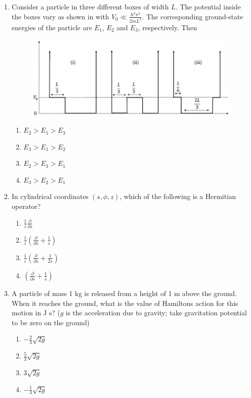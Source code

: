 \documentclass[journal,12pt,onecolumn]{IEEEtran}
\theoremstyle{remark}
\begin{document}
\begin{enumerate}
\item
Consider a particle in three different boxes of width $L$. The potential inside the boxes vary as shown in  with $V_0 \ll \frac{\hbar^2\pi^2}{2mL^2}$. The corresponding ground-state energies of the particle are $E_1$, $E_2$ and $E_3$, respectively. Then
\begin{center}
    \begin{figure}[H] \caption{} \label{fig:39}\includegraphics{figs/39.png}\end{figure}%
\end{center}
\begin{enumerate}
    \item $E_2 > E_1 > E_3$
    \item $E_3 > E_1 > E_2$
    \item $E_2 > E_3 > E_1$
    \item $E_3 > E_2 > E_1$
\end{enumerate}


\item
In cylindrical coordinates $(s, \phi, z)$, which of the following is a Hermitian operator?
\begin{enumerate}
    \item $\frac{1}{i} \frac{\partial}{\partial s}$
    \item $\frac{1}{i} \left( \frac{\partial}{\partial s} + \frac{1}{s} \right)$
    \item $\frac{1}{i} \left( \frac{\partial}{\partial s} + \frac{1}{2s} \right)$
    \item $\left( \frac{\partial}{\partial s} + \frac{1}{s} \right)$
\end{enumerate}


\item
A particle of mass 1 kg is released from a height of 1 m above the ground. When it reaches the ground, what is the value of Hamilton\textquotesingle s action for this motion in J s? ($g$ is the acceleration due to gravity; take gravitation potential to be zero on the ground)
\begin{enumerate}
    \item $-\frac{2}{3}\sqrt{2g}$
    \item $\frac{5}{3}\sqrt{2g}$
    \item $3\sqrt{2g}$
    \item $-\frac{1}{3}\sqrt{2g}$
\end{enumerate}



\end{enumerate}
\end{document}
